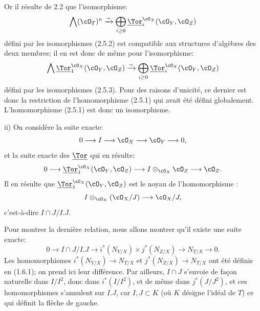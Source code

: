 Or il
résulte de 2.2 que l'isomorphisme:
\[
\bigwedge(\cO_T)^n\xrightarrow{\sim}
\bigoplus_{i\ge0}\underline{\Tor}_i^{\cO_X}(\cO_Y,\cO_Z)
\]
défini par les isomorphismes (2.5.2) est compatible aux structures d'algèbres des deux membres; il en est donc de même pour l'isomorphisme:
\[
\bigwedge\underline{\Tor}_1^{\cO_X}(\cO_Y,\cO_Z)\xrightarrow{\sim}
\bigoplus_{i\ge0}\underline{\Tor}_i^{\cO_X}(\cO_Y,\cO_Z)
\]
défini par les isomorphismes (2.5.3). Pour des raisons d'unicité, ce dernier est donc la restriction de l'homomorphisme (2.5.1) qui avait été défini globalement. L'homomorphisme (2.5.1) est donc un isomorphisme.

ii) On considère la suite exacte:
\[
0\longrightarrow I\longrightarrow \cO_X\longrightarrow \cO_Y\longrightarrow0,
\]
et la suite exacte des \(\underline{\Tor}\) qui en résulte:
\[
0\longrightarrow\underline{\Tor}_1^{\cO_X}(\cO_Y,\cO_Z)
\longrightarrow I\otimes_{\cO_X}\cO_Z
\longrightarrow \cO_Z.
\]
Il en résulte que \(\underline{\Tor}_1^{\cO_X}(\cO_Y,\cO_Z)\) est le noyau de l'homomorphisme :
\[
I\otimes_{\cO_X}(\cO_X/J)\longrightarrow \cO_X/J,
\]
c'est-à-dire \(I\cap J/I.J\).

Pour montrer la dernière relation, nous allons montrer qu'il existe une suite exacte:
\[
0\longrightarrow I\cap J/I.J
\longrightarrow i^*(N_{Y/X})\times j^*(N_{Z/X})
\longrightarrow N_{T/X}\longrightarrow0.
\]
Les homomorphismes \(i^*(N_{Y/X})\to N_{T/X}\) et \(j^*(N_{Z/X})\to N_{T/X}\) ont été définis en (1.6.1); on prend ici leur différence. Par ailleurs, \(I\cap J\) s'envoie de façon naturelle dans \(I/I^2\), donc dans \(i^*(I/I^2)\), et de même dans \(j^*(J/J^2)\), et ces homomorphismes s'annulent sur \(I.J\), car \(I,J\subset K\) (où \(K\) désigne l'idéal de \(T\)) ce qui définit la flèche de gauche.

